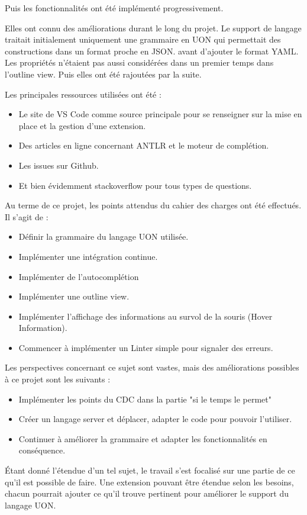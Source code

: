 Puis les fonctionnalités ont été implémenté progressivement.

Elles ont connu des améliorations durant le long du projet.
Le support de langage traitait initialement uniquement une grammaire en UON qui permettait des constructions dans un format proche en JSON.
avant d'ajouter le format YAML.
Les propriétés n'étaient pas aussi considérées dans un premier temps dans l'outline view. Puis elles ont été rajoutées par la suite.

Les principales ressources utilisées ont été :

\begin{itemize}
    \item Le site de VS Code comme source principale pour se renseigner sur la mise en place et la gestion d'une extension.
    \item Des articles en ligne concernant ANTLR et le moteur de complétion.
    \item Les issues sur Github.
    \item Et bien évidemment stackoverflow pour tous types de questions.
\end{itemize}


Au terme de ce projet, les points attendus du cahier des charges ont été effectués. Il s'agit de :
\begin{itemize}
    \item Définir la grammaire du langage UON utilisée.
    \item Implémenter une intégration continue.
    \item Implémenter de l'autocomplétion
    \item Implémenter une outline view.
    \item Implémenter l'affichage des informations au survol de la souris (Hover Information).
    \item Commencer à implémenter un Linter simple pour signaler des erreurs.
\end{itemize}

Les perspectives concernant ce sujet sont vastes, mais des améliorations possibles à ce projet sont les suivants :
\begin{itemize}
    \item Implémenter les points du CDC dans la partie "si le temps le permet"
    \item Créer un langage server et déplacer, adapter le code pour pouvoir l'utiliser.
    \item Continuer à améliorer la grammaire et adapter les fonctionnalités en conséquence.
\end{itemize}

Étant donné l'étendue d'un tel sujet, le travail s'est focalisé sur une partie de ce qu'il est possible de faire.
Une extension pouvant être étendue selon les besoins, chacun pourrait ajouter ce qu'il trouve pertinent pour améliorer le support du langage UON.

